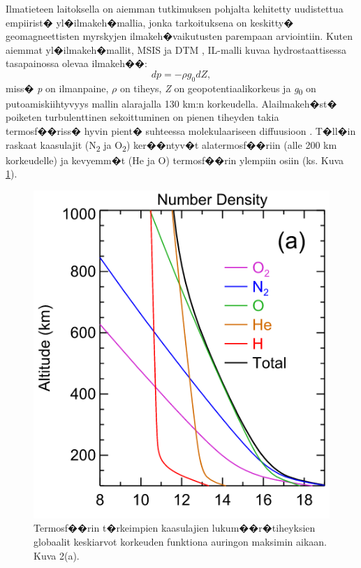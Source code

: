 \documentclass[12pt,a4paper,finnish,margin=2in]{article}
\begin{document}
Ilmatieteen laitoksella on aiemman tutkimuksen \citep{iipponen_2015} pohjalta kehitetty uudistettua empiirist� yl�ilmakeh�mallia, jonka tarkoituksena on keskitty� geomagneettisten myrskyjen ilmakeh�vaikutusten parempaan arviointiin. Kuten aiemmat yl�ilmakeh�mallit, MSIS \citep{picone_2002} ja DTM \citep{bruinsma_2015}, IL-malli kuvaa hydrostaattisessa tasapainossa olevaa ilmakeh��:
\begin{equation} \label{hydrostatic_eq}
dp = -\rho g_0 dZ,
\end{equation}
miss� \textit{p} on ilmanpaine, $\rho$ on tiheys, \textit{Z} on geopotentiaalikorkeus ja \textit{g}\textsubscript{0} on putoamiskiihtyvyys mallin alarajalla 130 km:n korkeudella. Alailmakeh�st� poiketen turbulenttinen sekoittuminen on pienen tiheyden takia termosf��riss� hyvin pient� suhteessa molekulaariseen diffuusioon \citep{emmert_2015}. T�ll�in raskaat kaasulajit (N\textsubscript{2} ja O\textsubscript{2}) ker��ntyv�t alatermosf��riin (alle 200 km korkeudelle) ja kevyemm�t (He ja O) termosf��rin ylempiin osiin (ks. Kuva \ref{fig:emmert_tiheys}). 
\begin{figure}[t]
\centering
\includegraphics[scale = 0.4]{emmert_tiheys}
\caption{Termosf��rin t�rkeimpien kaasulajien lukum��r�tiheyksien globaalit keskiarvot korkeuden funktiona auringon maksimin aikaan. \citet{emmert_2015} Kuva 2(a).}
\label{fig:emmert_tiheys}
\end{figure}
\end{document}
